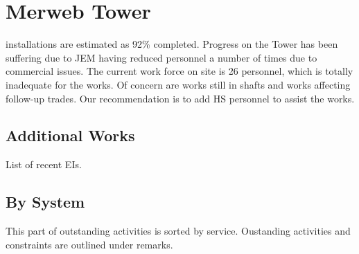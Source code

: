 \chapter{Merweb Tower}

 installations are estimated as 92\% completed. Progress on the Tower has been suffering due to JEM having reduced personnel a number of times due to commercial issues. The current work force on site is 26 personnel, which is totally inadequate for the works.
Of concern are works still in shafts and works affecting follow-up trades. Our recommendation is to add HS personnel to assist the works.


\section{Additional Works}

List of recent EIs.




\section{By System}
This part of outstanding activities is sorted by service. Oustanding activities and constraints are outlined under remarks. 
\bigskip

\setcounter{sectionstep}{0}

\def\tablesection{%
  \midrule
  \stepcounter{step}%
  \setcounter{sectionstep}{-1}%
  \setcounter{sectionstep}{-1}%
}

\def\Inc{%
  \stepcounter{sectionstep}%
\thestep.0\thesectionstep%
}


